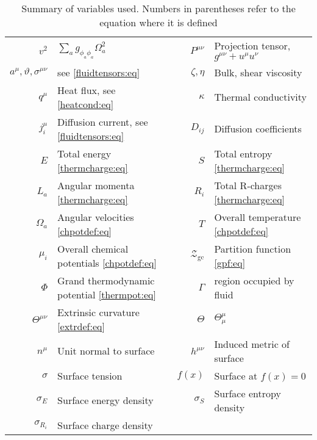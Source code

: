 \documentclass[12pt]{article}
\newcommand{\mg}{\mu}
\newcommand{\gpf}{\mathcal{Z}_\mathrm{gc}}
\newcommand{\tc}{\mathcal{T_\mathrm{c}}}
\begin{document}
\begin{table}
\begin{center}
\begin{tabular}{||r|l||r|l||}
    $v^2$ & $\sum_a g_{\phi_a\phi_a}\Omega_a^2$ & $P^{\mu\nu}$ & Projection tensor, $g^{\mu\nu}+u^\mu u^\nu$ \\
    $a^\mu,\vartheta,\sigma^{\mu\nu}$ & see \eqref{fluidtensors:eq} & $\zeta,\eta$ & Bulk, shear viscosity \\
    $q^\mu$ & Heat flux, see \eqref{heatcond:eq} & $\kappa$ & Thermal conductivity \\
    $j^\mu_{i}$ & Diffusion current, see \eqref{fluidtensors:eq} & $D_{ij}$ & Diffusion coefficients \\
    \hline
%
    $E$ & Total energy \eqref{thermcharge:eq} & $S$ & Total entropy \eqref{thermcharge:eq} \\
    $L_a$ & Angular momenta \eqref{thermcharge:eq} & $R_i$ & Total R-charges \eqref{thermcharge:eq} \\
    $\Omega_a$ & Angular velocities \eqref{chpotdef:eq} & $T$ & Overall temperature \eqref{chpotdef:eq} \\
    $\mg_i$ & Overall chemical potentials \eqref{chpotdef:eq} & $\gpf$ & Partition function \eqref{gpf:eq} \\
    $\Phi$ & Grand thermodynamic potential \eqref{thermpot:eq} & $\Gamma$ & region occupied by fluid \\
    \hline
%
    $\Theta^{\mu\nu}$ & Extrinsic curvature \eqref{extrdef:eq} & $\Theta$ & $\Theta^\mu_\mu$ \\
    $n^\mu$ & Unit normal to surface & $h^{\mu\nu}$ & Induced metric of surface \\
    $\sigma$ & Surface tension & $f(x)$ & Surface at $f(x)=0$ \\
    $\sigma_E$ & Surface energy density & $\sigma_S$ & Surface entropy density \\
    $\sigma_{R_i}$ & Surface charge density & & \\
    \hline
  \end{tabular}
\end{center}
\caption{Summary of variables used. Numbers in parentheses refer to the equation where it is defined \label{tab:notation}}
\end{table}







%
\end{document}
